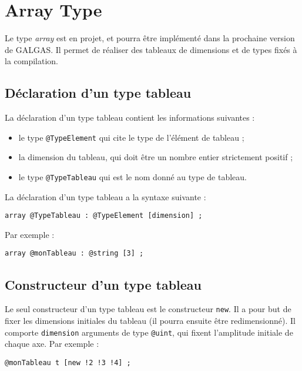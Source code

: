 
\chapter{Array Type}

Le type \emph{array} est en projet, et pourra être implémenté dans la prochaine version de GALGAS. Il permet de réaliser des tableaux de dimensions et de types fixés à la compilation.

\section{Déclaration d'un type tableau}

La déclaration d'un type tableau contient les informations suivantes :
\begin{itemize}
  \item le type \lstinline[language=galgas]!@TypeElement! qui cite le type de l'élément de tableau ;
  \item la dimension du tableau, qui doit être un nombre entier strictement positif ;
  \item le type \lstinline[language=galgas]!@TypeTableau! qui est le nom donné au type de tableau.
\end{itemize}

La déclaration d'un type tableau a la syntaxe suivante :
\begin{lstlisting}[language=galgas]
array @TypeTableau : @TypeElement [dimension] ;
\end{lstlisting}

Par exemple :
\begin{lstlisting}[language=galgas]
array @monTableau : @string [3] ;
\end{lstlisting}


\section{Constructeur d'un type tableau}

Le seul constructeur d'un type tableau est le constructeur \lstinline[language=galgas]!new!. Il a pour but de fixer les dimensions initiales du tableau (il pourra ensuite être redimensionné). Il comporte \lstinline[language=galgas]!dimension! arguments de type \lstinline[language=galgas]!@uint!, qui fixent l'amplitude initiale de chaque axe.
Par exemple :
\begin{lstlisting}[language=galgas]
  @monTableau t [new !2 !3 !4] ;
\end{lstlisting}


